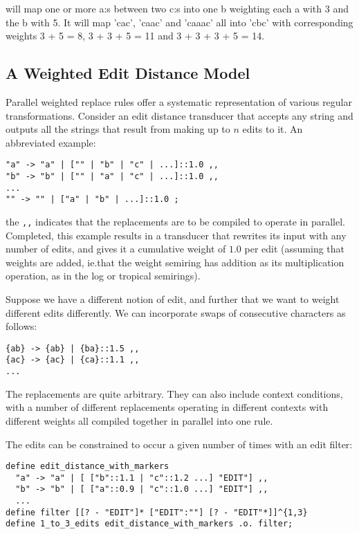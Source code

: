 \documentclass{llncs}
\begin{document}
will map one or more a:s between two c:s into one b weighting each a with 3
and the b with 5. It will map 'cac', 'caac' and 'caaac' all into 'cbc' with
corresponding weights 3 + 5 = 8, 3 + 3 + 5 = 11 and 3 + 3 + 3 + 5 = 14.

\subsection{A Weighted Edit Distance Model}

Parallel weighted replace rules offer a systematic representation of various
regular transformations. Consider an edit distance transducer that accepts
any string and outputs all the strings that result from making up to $n$ edits
to it. An abbreviated example:

\begin{framed}
\begin{verbatim}
"a" -> "a" | ["" | "b" | "c" | ...]::1.0 ,,
"b" -> "b" | ["" | "a" | "c" | ...]::1.0 ,,
...
"" -> "" | ["a" | "b" | ...]::1.0 ;
\end{verbatim}
\end{framed}

the \verb+,,+ indicates that the replacements are to be compiled to operate
in parallel. Completed, this example results in a transducer that rewrites
its input with any number of edits, and gives it a cumulative weight of
$1.0$ per edit (assuming that weights are added, ie.\@ that the weight semiring
has addition as its multiplication operation, as in the log or tropical
semirings).

Suppose we have a different notion of edit, and further that we want to weight
different edits differently. We can incorporate swaps of consecutive
characters as follows:

\begin{framed}
\begin{verbatim}
{ab} -> {ab} | {ba}::1.5 ,,
{ac} -> {ac} | {ca}::1.1 ,,
... 
\end{verbatim}
\end{framed}

The replacements are quite arbitrary. They can also include context conditions,
with a number of different replacements operating in different contexts with
different weights all compiled together in parallel into one rule.

The edits can be constrained to occur a given number of times with an edit
filter:

\begin{framed}
\begin{verbatim}
define edit_distance_with_markers
  "a" -> "a" | [ ["b"::1.1 | "c"::1.2 ...] "EDIT"] ,,
  "b" -> "b" | [ ["a"::0.9 | "c"::1.0 ...] "EDIT"] ,,
  ...
define filter [[? - "EDIT"]* ["EDIT":""] [? - "EDIT"*]]^{1,3}
define 1_to_3_edits edit_distance_with_markers .o. filter;
\end{verbatim}
\end{framed}
\end{document}
